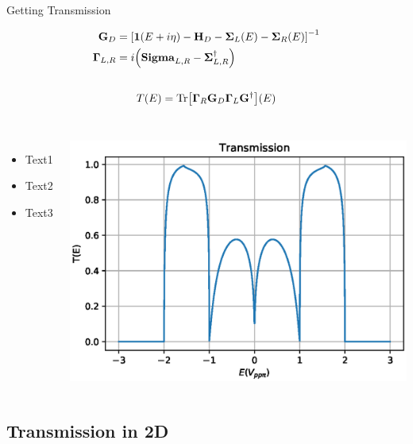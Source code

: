 \documentclass[hyperref={colorlinks=true,urlcolor=blue,linkcolor=.},aspectratio=1610,mathserif]{beamer}
\newcommand{\im}[3]{\inputminted[linenos=true, python3=true, firstline=#2, lastline=#3]{python}{#1}}
\begin{document}
\begin{frame}{Getting Transmission}
    \centering
\begin{overprint}
\begin{align*}
    \vb{G}_D &= \bqty{\vb{1}\pqty{E+i\eta}-\vb{H}_D - \vb{\Sigma}_L(E)-\vb{\Sigma}_R(E)}^{-1}\\
    \vb{\Gamma}_{L,R} &= i\pqty{\vb{Sigma}_{L,R} - \vb{\Sigma}_{L,R}^{\dagger}}
\end{align*}
\im{Listings/Functions.py}{225}{228}
\begin{align*}
    T(E) = \mathrm{Tr}\bqty{\vb{\Gamma}_R\vb{G}_D\vb{\Gamma}_L\vb{G}^{\dagger}}(E)
\end{align*}
    \im{Listings/Functions.py}{240}{243}
    \begin{columns}[c]
    \begin{itemize}
        \item Text1
        \item Text2
        \item Text3
    \end{itemize}
    \includegraphics[width=\textwidth]{Figures/BetaTE.eps}
    \end{columns}
\end{overprint}
\end{frame}

\subsection{Transmission in 2D}
\end{document}
